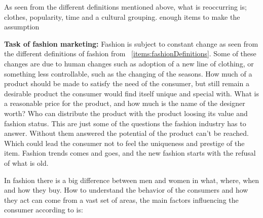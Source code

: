 As seen from the different definitions mentioned above, what is reoccurring is;
clothes, popularity, time and a cultural grouping. %
enough items to make the assumption

\textbf{Task of fashion marketing:}
Fashion is subject to constant change as seen from the different definitions of fashion from ~\ref{items:fashionDefinitions}.
Some of these changes are due to human changes such as adoption of a new line of clothing, or something less controllable, such as the changing of the seasons.
How much of a product should be made to satisfy the need of the consumer, but still remain a desirable product the consumer would find itself unique and special with.
What is a reasonable price for the product, and how much is the name of the designer worth?
Who can distribute the product with the product loosing its value and fashion status.
This are just some of the questions the fashion industry has to answer.
Without them answered the potential of the product can't be reached.
Which could lead the consumer not to feel the uniqueness and prestige of the item.
Fashion trends comes and goes, and the new fashion starts with the refusal of what is old.


In fashion there is a big difference between men and women in what, where, when
and how they buy.  How to understand the behavior of the consumers and how they
act can come from a vast set of areas, the main factors influencing the consumer according to \cite{kotler2009marketing} is: %

